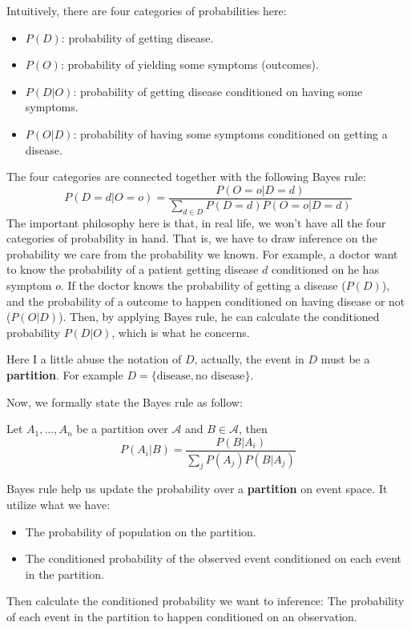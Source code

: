 \documentclass[11pt]{report}
\begin{document}
Intuitively, there are four categories of probabilities here:
\begin{itemize}
	\item $P(D)$: probability of getting disease.
	\item $P(O)$: probability of yielding some symptoms (outcomes).
	\item $P(D|O)$: probability of getting disease conditioned on having some symptoms.
	\item $P(O|D)$: probability of having some symptoms conditioned on getting a disease.
\end{itemize}
The four categories are connected together with the following Bayes rule:
$$P(D = d|O = o) = \frac{P(O=o|D=d)}{\sum_{d\in D}P(D=d)P(O=o|D=d)}$$
The important philosophy here is that, in real life, we won't have all the four categories of probability in hand. That is, we have to draw inference on the probability we care from the probability we known. For example, a doctor want to know the probability of a patient getting disease $d$ conditioned on he has symptom $o$. If the doctor knows the probability of getting a disease ($P(D)$), and the probability of a outcome to happen conditioned on having disease or not ($P(O|D)$). Then, by applying Bayes rule, he can calculate the conditioned probability $P(D|O)$, which is what he concerns.

Here I a little abuse the notation of $D$, actually, the event in $D$ must be a {\bf partition}. For example $D=\{\mbox{disease},\mbox{no disease}\}$.

Now, we formally state the Bayes rule as follow:
\begin{theorem}
	Let $A_1,...,A_n$ be a partition over $\mathcal{A}$ and $B\in\mathcal{A}$, then
	$$P(A_i|B) = \frac{P(B|A_i)}{\sum_j P(A_j)P(B|A_j)}$$
\end{theorem}

\begin{intuition}
	Bayes rule help us update the probability over a {\bf partition} on event space. It utilize what we have:
	\begin{itemize}
		\item The probability of population on the partition.
		\item The conditioned probability of the observed event conditioned on each event in the partition. 
	\end{itemize}
	Then calculate the conditioned probability we want to inference: The probability of each event in the partition to happen conditioned on an observation.
\end{intuition}
\end{document}
